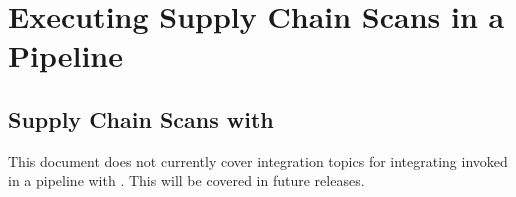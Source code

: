 \chapter{Executing Supply Chain Scans in a Pipeline}

\section{Supply Chain Scans with \cxone}

This document does not currently cover integration topics for integrating
\scaresolver invoked in a pipeline with \cxone.  This will be covered in 
future releases.
